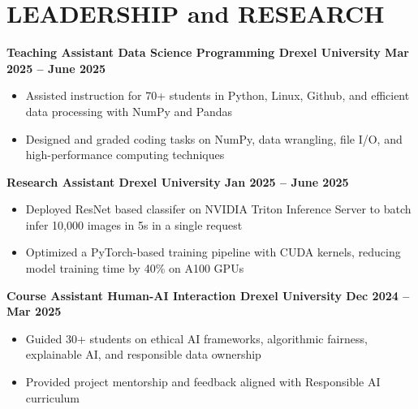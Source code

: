 \documentclass[10pt]{article}
\begin{document}
\vspace{-0.4cm}
\section*{LEADERSHIP and RESEARCH}
\vspace{-0.1cm}

\noindent
\textbf{Teaching Assistant \textbar{} Data Science Programming \textbar{} Drexel University  \hfill Mar 2025 -- June 2025} \\
\vspace{-0.4cm}
\begin{itemize}[leftmargin=0.6cm, itemsep=-0.1cm, topsep=0cm]

    \item Assisted instruction for 70+ students in Python, Linux, Github, and efficient data processing with NumPy and Pandas

    \item Designed and graded coding tasks on  NumPy, data wrangling, file I/O, and high-performance computing techniques

\end{itemize}

\noindent
\textbf{Research Assistant \textbar{} Drexel University \hfill Jan 2025 -- June 2025} \\
\vspace{-0.4cm}
\begin{itemize}[leftmargin=0.6cm, itemsep=-0.1cm, topsep=0cm]

    \item Deployed ResNet based classifer on NVIDIA Triton Inference Server to batch infer 10,000 images in 5s in a single request

    \item Optimized a PyTorch-based training pipeline with CUDA kernels, reducing model training time by 40\% on A100 GPUs

\end{itemize}

\noindent
\textbf{Course Assistant \textbar{} Human-AI Interaction \textbar{} Drexel University  \hfill Dec 2024 -- Mar 2025} \\
\vspace{-0.4cm}
\begin{itemize}[leftmargin=0.6cm, itemsep=-0.1cm, topsep=0cm]

    \item Guided 30+ students on ethical AI frameworks, algorithmic fairness, explainable AI, and responsible data ownership

    \item Provided project mentorship and feedback aligned with Responsible AI curriculum

\end{itemize}
\end{document}
